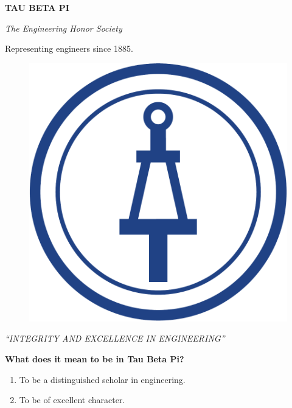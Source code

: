 \documentclass{extarticle}
\begin{document}
\begin{center}
{\Huge \textbf{TAU BETA PI}}
\end{center}

\begin{center}
{\large \textit{The Engineering Honor Society}}
\end{center}

\begin{center}
{\small Representing engineers since 1885.}
\end{center}

\begin{figure}[h]
    \includegraphics[scale=0.6]{tbp-logo.png}
    \centering
\end{figure}

\begin{center}
{\Large \textit{``INTEGRITY AND EXCELLENCE IN ENGINEERING''}}
\end{center}

\bigskip
{\large \textbf{What does it mean to be in Tau Beta Pi?}}

\begin{enumerate}
    \item To be a distinguished scholar in engineering.
    \item To be of excellent character.
\end{enumerate}
\end{document}
